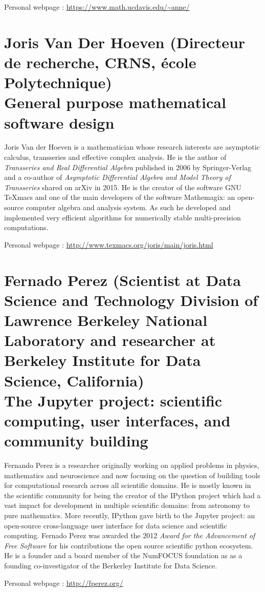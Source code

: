 \documentclass{paper}
\newcommand{\orateur}[3]{%
  \section*{%
    #1 {\small(#2)}\nopagebreak\\
    #3}
}
\begin{document}
\medskip

Personal webpage : \url{https://www.math.ucdavis.edu/~anne/}

\orateur
{Joris Van Der Hoeven}
{Directeur de recherche, CRNS, école Polytechnique}
{General purpose mathematical software design}

Joris Van der Hoeven is a mathematician whose research interests are
asymptotic calculus, transseries and effective complex analysis. 
He is the author of \textit{Transseries and Real Differential Algebra}
published in 2006 by Springer-Verlag and a co-author of \textit{Asymptotic
 Differential Algebra and Model Theory of Transseries} shared on arXiv in 2015.
He is the creator of the software GNU TeXmacs and one of the main developers 
of the software Mathemagix: an open-source computer algebra and analysis system. 
As such he developed and implemented very efficient algorithms for numerically stable 
multi-precision computations.

\medskip

Personal webpage : \url{http://www.texmacs.org/joris/main/joris.html}

\orateur
{Fernado Perez}
{Scientist at Data Science and Technology Division of Lawrence Berkeley National Laboratory and researcher at Berkeley Institute for Data Science, California}
{The Jupyter project: scientific computing, user interfaces, and community building}

Fernando Perez is a researcher originally working on applied problems in physics, 
mathematics and neuroscience and now focusing on the question of building tools 
for computational research across all scientific domains. He is mostly known
in the scientific community for being the creator of the IPython project which
had a vast impact for development in multiple scientific domains: from astronomy
to pure mathematics. More recently, IPython gave birth to the Jupyter project: an 
open-source cross-language user interface for data science and scientific computing. 
Fernado Perez was awarded the 2012 \textit{Award for the Advancement of Free Software} for
his contributions the open source scientific python ecosystem. He is a founder and  a board 
member of the NumFOCUS foundation as as a founding co-investigator of the Berkerley Institute
for Data Science.

\medskip

Personal webpage : \url{http://fperez.org/}
\end{document}
